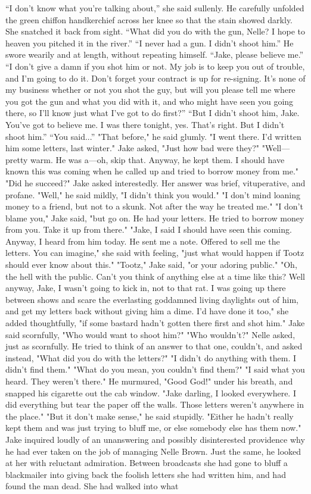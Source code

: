 \documentclass{novel}
\begin{document}
“I don’t know what you’re talking about,” she said sullenly. He carefully unfolded the green chiffon handkerchief across her knee so that the stain showed darkly. She snatched it back from sight. “What did you do with the gun, Nelle? I hope to heaven you pitched it in the river.” “I never had a gun. I didn’t shoot him.” He swore wearily and at length, without repeating himself. “Jake, please believe me.” “I don’t give a damn if you shot him or not. My job is to keep you out of trouble, and I’m going to do it. Don’t forget your contract is up for re-signing. It’s none of my business whether or not you shot the guy, but will you please tell me where you got the gun and what you did with it, and who might have seen you going there, so I’ll know just what I’ve got to do first?” “But I didn’t shoot him, Jake. You’ve got to believe me. I was there tonight, yes. That’s right. But I didn’t shoot him.” “You said...” "That before," he said glumly. "I went there. I'd written him some letters, last winter." Jake asked, "Just how bad were they?" "Well—pretty warm. He was a—oh, skip that. Anyway, he kept them. I should have known this was coming when he called up and tried to borrow money from me." "Did he succeed?" Jake asked interestedly. Her answer was brief, vituperative, and profane. "Well," he said mildly, "I didn't think you would." "I don't mind loaning money to a friend, but not to a skunk. Not after the way he treated me." "I don't blame you," Jake said, "but go on. He had your letters. He tried to borrow money from you. Take it up from there." "Jake, I said I should have seen this coming. Anyway, I heard from him today. He sent me a note. Offered to sell me the letters. You can imagine," she said with feeling, "just what would happen if Tootz should ever know about this." "Tootz," Jake said, "or your adoring public." "Oh, the hell with the public. Can't you think of anything else at a time like this? Well anyway, Jake, I wasn't going to kick in, not to that rat. I was going up there between shows and scare the everlasting goddamned living daylights out of him, and get my letters back without giving him a dime. I'd have done it too," she added thoughtfully, "if some bastard hadn't gotten there first and shot him." Jake said scornfully, "Who would want to shoot him?" "Who wouldn't?" Nelle asked, just as scornfully. He tried to think of an answer to that one, couldn't, and asked instead, "What did you do with the letters?" "I didn't do anything with them. I didn't find them." "What do you mean, you couldn't find them?" "I said what you heard. They weren't there." He murmured, "Good God!" under his breath, and snapped his cigarette out the cab window. "Jake darling, I looked everywhere. I did everything but tear the paper off the walls. Those letters weren't anywhere in the place." "But it don't make sense," he said stupidly. "Either he hadn't really kept them and was just trying to bluff me, or else somebody else has them now." Jake inquired loudly of an unanswering and possibly disinterested providence why he had ever taken on the job of managing Nelle Brown. Just the same, he looked at her with reluctant admiration. Between broadcasts she had gone to bluff a blackmailer into giving back the foolish letters she had written him, and had found the man dead. She had walked into what 
\end{document}
